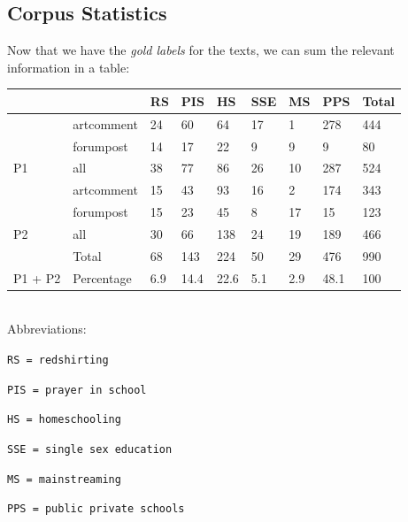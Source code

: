 \subsection{Corpus Statistics}
Now that we have the \emph{gold labels} for the texts, we can sum the relevant information in a table: 
\begin{table}[h]
\centering
\begin{tabular}{ll|l|l|l|l|l|l|l|}
\cline{3-9}
 &  & RS & PIS & HS & SSE & MS & PPS & Total \\ \hline
\multicolumn{1}{|l|}{} & artcomment & 24 & 60 & 64 & 17 & 1 & 278 & 444 \\ \cline{2-9} 
\multicolumn{1}{|l|}{} & forumpost & 14 & 17 & 22 & 9 & 9 & 9 & 80 \\ \cline{2-9} 
\multicolumn{1}{|l|}{\multirow{-3}{*}{P1}} & \cellcolor[HTML]{C0C0C0}all & \cellcolor[HTML]{C0C0C0}38 & \cellcolor[HTML]{C0C0C0}77 & \cellcolor[HTML]{C0C0C0}86 & \cellcolor[HTML]{C0C0C0}26 & \cellcolor[HTML]{C0C0C0}10 & \cellcolor[HTML]{C0C0C0}287 & \cellcolor[HTML]{C0C0C0}524 \\ \hline
\multicolumn{1}{|l|}{} & artcomment & 15 & 43 & 93 & 16 & 2 & 174 & 343 \\ \cline{2-9} 
\multicolumn{1}{|l|}{} & forumpost & 15 & 23 & 45 & 8 & 17 & 15 & 123 \\ \cline{2-9} 
\multicolumn{1}{|l|}{\multirow{-3}{*}{P2}} & \cellcolor[HTML]{C0C0C0}all & \cellcolor[HTML]{C0C0C0}30 & \cellcolor[HTML]{C0C0C0}66 & \cellcolor[HTML]{C0C0C0}138 & \cellcolor[HTML]{C0C0C0}24 & \cellcolor[HTML]{C0C0C0}19 & \cellcolor[HTML]{C0C0C0}189 & \cellcolor[HTML]{C0C0C0}466 \\ \hline
\multicolumn{1}{|l|}{} & Total & 68 & 143 & 224 & 50 & 29 & 476 & 990 \\ \cline{2-9} 
\multicolumn{1}{|l|}{\multirow{-2}{*}{P1  + P2}} & Percentage & 6.9 & 14.4 & 22.6 & 5.1 & 2.9 & 48.1 & 100 \\ \hline
\end{tabular}
\end{table}
\\
Abbreviations:

\texttt{RS = redshirting}

\texttt{PIS = prayer in school}

\texttt{HS = homeschooling}

\texttt{SSE = single sex education}

\texttt{MS = mainstreaming}

\texttt{PPS = public private schools}


